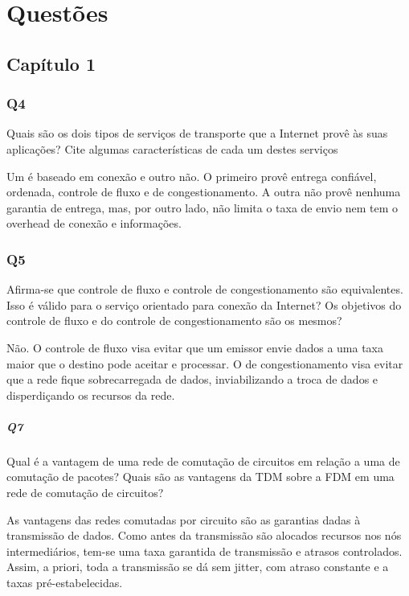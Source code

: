 \chapter{Questões}

\section{Capítulo 1}

\subsection{Q4}
Quais são os dois tipos de serviços de transporte que a Internet provê às suas aplicações? Cite algumas características de cada um destes serviços

Um é baseado em conexão e outro não. 
O primeiro provê entrega confiável, ordenada, controle de fluxo e de congestionamento. 
A outra não provê nenhuma garantia de entrega, mas, por outro lado, não limita o taxa de envio nem tem o overhead de conexão e informações.

\subsection{Q5}
Afirma-se que controle de fluxo e controle de congestionamento são equivalentes. Isso é válido para o serviço orientado para conexão da Internet? Os objetivos do controle de fluxo e do controle de congestionamento são os mesmos?

Não. O controle de fluxo visa evitar que um emissor envie dados a uma taxa maior que o destino pode aceitar e processar.
O de congestionamento visa evitar que a rede fique sobrecarregada de dados, inviabilizando a troca de dados e disperdiçando os recursos da rede.

\paragraph{Q7}
Qual é a vantagem de uma rede de comutação de circuitos em relação a uma de comutação de pacotes? Quais são as vantagens da TDM sobre a FDM em uma rede de comutação de circuitos?

As vantagens das redes comutadas por circuito são as garantias dadas à transmissão de dados. 
Como antes da transmissão são alocados recursos nos nós intermediários, tem-se uma taxa garantida de transmissão e atrasos controlados.
Assim, a priori, toda a transmissão se dá sem jitter, com atraso constante e a taxas pré-estabelecidas.

